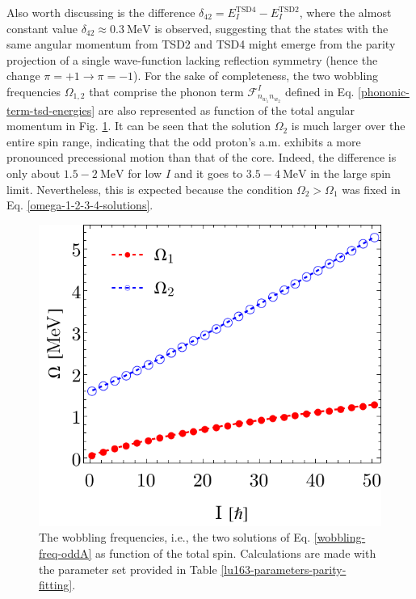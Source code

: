 Also worth discussing is the difference $\delta_{42}=E_I^\text{TSD4}-E_I^\text{TSD2}$, where the almost constant value $\delta_{42}\approx 0.3\ \text{MeV}$ is observed, suggesting that the states with the same angular momentum from TSD2 and TSD4 might emerge from the parity projection of a single wave-function lacking reflection symmetry (hence the change $\pi=+1\to\pi=-1$). For the sake of completeness, the two wobbling frequencies $\Omega_{1,2}$ that comprise the phonon term $\mathcal{F}^I_{n_{w_1}n_{w_2}}$ defined in Eq. \ref{phononic-term-tsd-energies} are also represented as function of the total angular momentum in Fig. \ref{lu163-wobbling-frequencies-parity}. It can be seen that the solution $\Omega_2$ is much larger over the entire spin range, indicating that the odd proton's a.m. exhibits a more pronounced precessional motion than that of the core. Indeed, the difference is only about $1.5-2\ \text{MeV}$ for low $I$ and it goes to $3.5-4\ \text{MeV}$ in the large spin limit. Nevertheless, this is expected because the condition $\Omega_2>\Omega_1$ was fixed in Eq. \ref{omega-1-2-3-4-solutions}.
\begin{figure}
    \centering
    \includegraphics[scale=0.8]{Chapters/Figures/parity-partners-plots/wobblingFrequency.pdf}
    \caption{The wobbling frequencies, i.e., the two solutions of Eq. \ref{wobbling-freq-oddA} as function of the total spin. Calculations are made with the parameter set provided in Table \ref{lu163-parameters-parity-fitting}.}
    \label{lu163-wobbling-frequencies-parity}
\end{figure}

